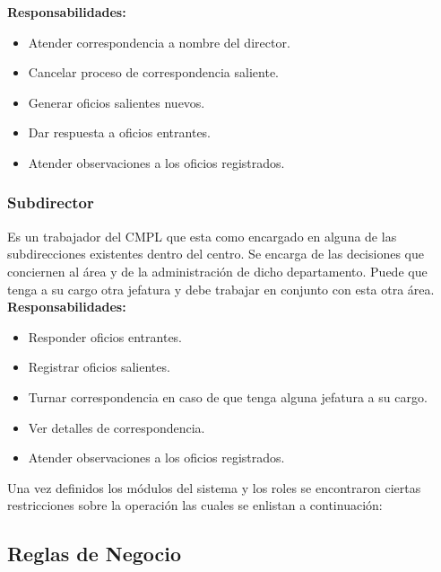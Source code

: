 \textbf{Responsabilidades:}
\begin{itemize}
	\item Atender correspondencia a nombre del director.
	\item Cancelar proceso de correspondencia saliente.
	\item Generar oficios salientes nuevos.
	\item Dar respuesta a oficios entrantes.
	\item Atender observaciones a los oficios registrados.
\end{itemize}

\subsubsection{Subdirector}
Es un trabajador del CMPL que esta como encargado en alguna de las subdirecciones existentes dentro del centro. Se encarga de las decisiones que conciernen al área y de la administración de dicho departamento. Puede que tenga a su cargo otra jefatura y debe trabajar en conjunto con esta otra área.\\ 

\textbf{Responsabilidades:}
\begin{itemize}
	\item Responder oficios entrantes.
	\item Registrar oficios salientes.
	\item Turnar correspondencia en caso de que tenga alguna jefatura a su cargo.
	\item Ver detalles de correspondencia.
	\item Atender observaciones a los oficios registrados.
\end{itemize}

Una vez definidos los módulos del sistema y los roles se encontraron ciertas restricciones sobre la operación las cuales se enlistan a continuación: \\ 

	\subsection{Reglas de Negocio}

